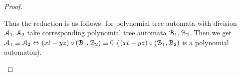 \begin{proof}
\begin{itemize}
  		Thus the reduction is as follows: for polynomial tree automata with division ${\mathcal A}_1, {\mathcal A}_2$ take corresponding polynomial tree automata ${\mathcal B}_1, {\mathcal B}_2$. Then we get ${\mathcal A}_1 \equiv {\mathcal A}_2 \Leftrightarrow (xt-yz)\circ({\mathcal B}_1, {\mathcal B}_2) \equiv 0$ ($(xt-yz)\circ({\mathcal B}_1, {\mathcal B}_2)$ is a polynomial automaton).
  		\end{itemize}


  		
\end{proof}
